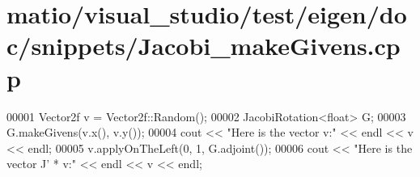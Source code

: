 \hypertarget{matio_2visual__studio_2test_2eigen_2doc_2snippets_2_jacobi__make_givens_8cpp_source}{}\section{matio/visual\+\_\+studio/test/eigen/doc/snippets/\+Jacobi\+\_\+make\+Givens.cpp}
\label{matio_2visual__studio_2test_2eigen_2doc_2snippets_2_jacobi__make_givens_8cpp_source}

\begin{DoxyCode}
00001 Vector2f v = Vector2f::Random();
00002 JacobiRotation<float> G;
00003 G.makeGivens(v.x(), v.y());
00004 cout << \textcolor{stringliteral}{"Here is the vector v:"} << endl << v << endl;
00005 v.applyOnTheLeft(0, 1, G.adjoint());
00006 cout << \textcolor{stringliteral}{"Here is the vector J' * v:"} << endl << v << endl;
\end{DoxyCode}
